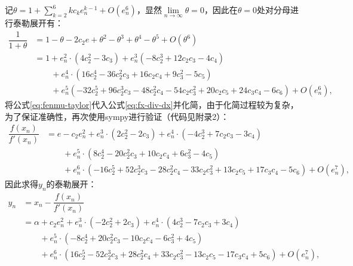 记$\theta = 1 + \sum\limits_{k=2}^6 kc_ke_n^{k-1} + O(e_n^6) $，显然$\lim\limits_{n\to \infty}\theta = 0$，因此在$\theta = 0$处对分母进行泰勒展开有：
\begin{equation}
    \label{eq:fenmu-taylor}
    \begin{aligned}
        \dfrac{1}{1+\theta} &= 1 - \theta - 2 c_{2} e + \theta^2 - \theta^3 + \theta^4 - \theta^5 + O(\theta^6) \\
        &= 1 + e_n^{2} \cdot \left(4 c_{2}^{2} - 3 c_{3}\right) + e_n^{3} \left(- 8 c_{2}^{3} + 12 c_{2} c_{3} - 4 c_{4}\right) \\
        &\qquad + e_n^{4} \cdot \left(16 c_{2}^{4} - 36 c_{2}^{2} c_{3} + 16 c_{2} c_{4} + 9 c_{3}^{2} - 5 c_{5}\right) \\
        &\qquad + e_n^{5} \left(- 32 c_{2}^{5} + 96 c_{2}^{3} c_{3} - 48 c_{2}^{2} c_{4} - 54 c_{2} c_{3}^{2} + 20 c_{2} c_{5} + 24 c_{3} c_{4} - 6 c_{6}\right) + O\left(e_n^{6}\right),
    \end{aligned}
\end{equation}
将公式\ref{eq:fenmu-taylor}代入公式\ref{eq:fx-div-dx}并化简，由于化简过程较为复杂，为了保证准确性，再次使用sympy进行验证（代码见附录2）：
\begin{equation}
    \begin{aligned}
        \dfrac{f(x_n)}{f'(x_n)} &= e - c_{2} e_n^{2} + e_n^{3} \cdot \left(2 c_{2}^{2} - 2 c_{3}\right) + e_n^{4} \cdot \left(- 4 c_{2}^{3} + 7 c_{2} c_{3} - 3 c_{4}\right) \\
        &\qquad + e_n^{5} \cdot \left(8 c_{2}^{4} - 20 c_{2}^{2} c_{3} + 10 c_{2} c_{4} + 6 c_{3}^{2} - 4 c_{5}\right) \\
        &\qquad + e_n^{6} \cdot \left(- 16 c_{2}^{5} + 52 c_{2}^{3} c_{3} - 28 c_{2}^{2} c_{4} - 33 c_{2} c_{3}^{2} + 13 c_{2} c_{5} + 17 c_{3} c_{4} - 5 c_{6}\right) + O\left(e_n^{7}\right),
    \end{aligned}
\end{equation}
因此求得$y_n$的泰勒展开：
\begin{equation}
    \label{eq:taylor-y}
    \begin{aligned}
        y_n &= x_n - \dfrac{f(x_n)}{f'(x_n)}\\
        &= \alpha + c_{2} e_n^{2} + e_n^{3} \cdot \left(- 2 c_{2}^{2} + 2 c_{3}\right) + e_n^{4} \cdot \left(4 c_{2}^{3} - 7 c_{2} c_{3} + 3 c_{4}\right) \\
        &\qquad + e_n^{5} \cdot \left(- 8 c_{2}^{4} + 20 c_{2}^{2} c_{3} - 10 c_{2} c_{4} - 6 c_{3}^{2} + 4 c_{5}\right) \\
        &\qquad + e_n^{6} \cdot \left(16 c_{2}^{5} - 52 c_{2}^{3} c_{3} + 28 c_{2}^{2} c_{4} + 33 c_{2} c_{3}^{2} - 13 c_{2} c_{5} - 17 c_{3} c_{4} + 5 c_{6}\right) + O\left(e_n^{7}\right),
    \end{aligned}
\end{equation}
